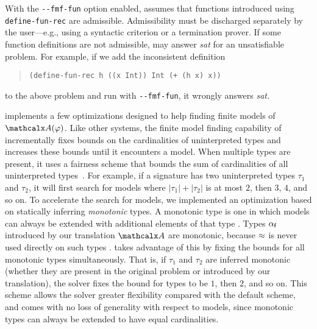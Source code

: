 With the \texttt{-}\texttt{-fmf-fun} option enabled, \cvc assumes that
functions introduced using \texttt{define-\allowbreak fun-\allowbreak rec} are admissible.
Admissibility must be discharged separately by the user---e.g., using a
syntactic criterion or a termination prover.
If some function definitions are not admissible, \cvc may answer \emph{sat} for
an unsatisfiable problem. For example, if we add the inconsistent definition
%
\begin{quote}
\begin{verbatim}
(define-fun-rec h ((x Int)) Int (+ (h x) x))
\end{verbatim}
\end{quote}
%
to the above problem and run \cvc with \texttt{-}\texttt{-fmf-fun},
it wrongly answers \emph{sat.}

\cvc implements a few optimizations designed to help finding finite models of
$\conv(\varphi)$.
Like other systems,
the finite model finding capability of \cvc incrementally fixes bounds on the cardinalities of uninterpreted types
and increases these bounds until it encounters a model.
When multiple types are present, it uses a fairness scheme that
bounds the sum of cardinalities of all uninterpreted types~\cite{reynolds2013finite}.
For example, if a signature has two uninterpreted types $\tau_1$ and $\tau_2$,
it will first search for models where
$\left\vert\tau_1\right\vert + \left\vert\tau_2\right\vert$ is at most $2$,
then $3$, $4$, and so on.
To accelerate the search for models,
we implemented an optimization based on statically inferring \emph{monotonic} types.
A monotonic type is one in which models can always be extended with additional
elements of that type \cite{blanchette-krauss-2011,claessen-et-al-2011}.
Types $\alpha_{\mathsf{f}}$ introduced by our translation $\conv$ are monotonic,
because $\approx$ is never used directly on such types \cite{claessen-et-al-2011}.
%
\cvc takes advantage of this by fixing the bounds for all
monotonic types simultaneously.
That is, if $\tau_1$ and $\tau_2$ are inferred monotonic (whether they are
present in the original problem or introduced by our translation),
the solver fixes the bound for  types to be $1$, then $2$, and so on.
This scheme allows the solver greater flexibility compared with the default scheme,
and comes with no loss of generality with respect to models,
since monotonic types can always be extended to have equal cardinalities.

